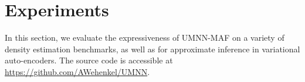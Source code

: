 \documentclass{article}
\begin{document}




\section{Experiments}

In this section, we evaluate the expressiveness of UMNN-MAF on a variety of density estimation benchmarks, as well as for approximate inference in variational auto-encoders.
The source code is accessible at \url{https://github.com/AWehenkel/UMNN}.
\end{document}
